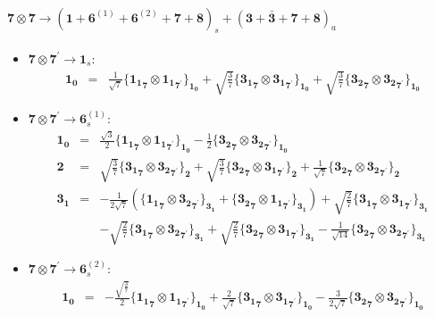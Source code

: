 \documentclass[english]{article}
\newcommand{\subcg}[3]{\big\{ {#1}\otimes{#2}\big\}^{}_{#3}}
\newcommand{\rep}[1]{\mathbf{#1}}
\begin{document}
\paragraph*{\Large $\rep{7}\otimes\rep{7}\to\left(\rep{1}+\rep{6}^{(1)}+\rep{6}^{(2)}+\rep{7}+\rep{8}\right)_s+\left(\rep{3}+\rep{\bar{3}}+\rep{7}+\rep{8}\right)_a$}
\begin{itemize}
\item $\rep{7}\otimes\rep{7}^{\prime}\to\rep{1}_{s}$:
\begin{eqnarray*}
\rep{1_0} &=& \frac{1}{\sqrt{7}}\subcg{\rep{1_1}_{\rep{7}}}{\rep{1_1}_{\rep{7}^{\prime}}}{\rep{1_0}}+\sqrt{\frac{3}{7}}\subcg{\rep{3_1}_{\rep{7}}}{\rep{3_1}_{\rep{7}^{\prime}}}{\rep{1_0}}+\sqrt{\frac{3}{7}}\subcg{\rep{3_2}_{\rep{7}}}{\rep{3_2}_{\rep{7}^{\prime}}}{\rep{1_0}}
\end{eqnarray*}
\item $\rep{7}\otimes\rep{7}^{\prime}\to\rep{6}_{s}^{(1)}$:
\begin{eqnarray*}
\rep{1_0} &=& \frac{\sqrt{3}}{2}\subcg{\rep{1_1}_{\rep{7}}}{\rep{1_1}_{\rep{7}^{\prime}}}{\rep{1_0}}-\frac{1}{2}\subcg{\rep{3_2}_{\rep{7}}}{\rep{3_2}_{\rep{7}^{\prime}}}{\rep{1_0}}
\\
\rep{2} &=& \sqrt{\frac{3}{7}}\subcg{\rep{3_1}_{\rep{7}}}{\rep{3_2}_{\rep{7}^{\prime}}}{\rep{2}}+\sqrt{\frac{3}{7}}\subcg{\rep{3_2}_{\rep{7}}}{\rep{3_1}_{\rep{7}^{\prime}}}{\rep{2}}+\frac{1}{\sqrt{7}}\subcg{\rep{3_2}_{\rep{7}}}{\rep{3_2}_{\rep{7}^{\prime}}}{\rep{2}}
\\
\rep{3_1} &=& -\frac{1}{2 \sqrt{7}}\left(\subcg{\rep{1_1}_{\rep{7}}}{\rep{3_2}_{\rep{7}^{\prime}}}{\rep{3_1}}+\subcg{\rep{3_2}_{\rep{7}}}{\rep{1_1}_{\rep{7}^{\prime}}}{\rep{3_1}}\right)+\sqrt{\frac{2}{7}}\subcg{\rep{3_1}_{\rep{7}}}{\rep{3_1}_{\rep{7}^{\prime}}}{\rep{3_1}} \\ 
 & & -\sqrt{\frac{2}{7}}\subcg{\rep{3_1}_{\rep{7}}}{\rep{3_2}_{\rep{7}^{\prime}}}{\rep{3_1}}+\sqrt{\frac{2}{7}}\subcg{\rep{3_2}_{\rep{7}}}{\rep{3_1}_{\rep{7}^{\prime}}}{\rep{3_1}}-\frac{1}{\sqrt{14}}\subcg{\rep{3_2}_{\rep{7}}}{\rep{3_2}_{\rep{7}^{\prime}}}{\rep{3_1}}
\end{eqnarray*}
\item $\rep{7}\otimes\rep{7}^{\prime}\to\rep{6}_{s}^{(2)}$:
\begin{eqnarray*}
\rep{1_0} &=& -\frac{\sqrt{\frac{3}{7}}}{2}\subcg{\rep{1_1}_{\rep{7}}}{\rep{1_1}_{\rep{7}^{\prime}}}{\rep{1_0}}+\frac{2}{\sqrt{7}}\subcg{\rep{3_1}_{\rep{7}}}{\rep{3_1}_{\rep{7}^{\prime}}}{\rep{1_0}}-\frac{3}{2 \sqrt{7}}\subcg{\rep{3_2}_{\rep{7}}}{\rep{3_2}_{\rep{7}^{\prime}}}{\rep{1_0}}

\end{eqnarray*}
\end{itemize}
\end{document}
